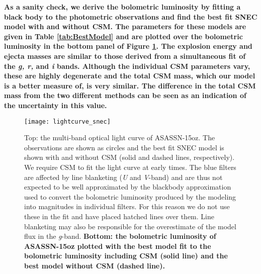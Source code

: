 \documentclass[a4paper,fleqn,usenatbib]{mnras}
\begin{document}
\textbf{As a sanity check, we derive the bolometric luminosity by fitting a black body to the photometric observations and find the best fit SNEC model with and without CSM. 
The parameters for these models are given in Table \ref{tab:BestModel} and are plotted over the bolometric luminosity in the bottom panel of Figure \ref{fig:snecLC}.
The explosion energy and ejecta masses are similar to those derived from a simultaneous fit of the {\it g, r,} and {\it i} bands. 
Although the individual CSM parameters vary, these are highly degenerate and the total CSM mass, which our model is a better measure of, is very similar.
The difference in the total CSM mass from the two different methods can be seen as an indication of the uncertainty in this value.}
\begin{figure}
\begin{center}
\texttt{[image: lightcurve\_snec]} %
\caption{Top: the multi-band optical light curve of ASASSN-15oz. 
The observations are shown as circles and the best fit SNEC model is shown with and without CSM (solid and dashed lines, respectively).
We require CSM to fit the light curve at early times. 
The blue filters are affected by line blanketing ({\it U} and {\it V}-band) and are thus not expected to be well approximated by the blackbody approximation used to convert the bolometric luminosity produced by the modeling into magnitudes in individual filters. 
For this reason we do not use these in the fit and have placed hatched lines over them.
Line blanketing may also be responsible for the overestimate of the model flux in the {\it g}-band.
\textbf{Bottom: the bolometric luminosity of ASASSN-15oz plotted with the best model fit to the bolometric luminosity including CSM (solid line) and the best model without CSM (dashed line).}}
\label{fig:snecLC}
\end{center}
\end{figure}
\end{document}

